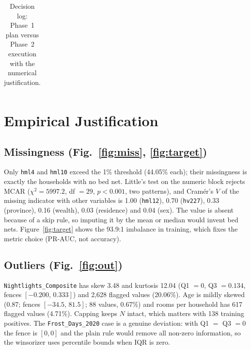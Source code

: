 \documentclass[11pt]{article}
\begin{document}
\begin{table}[t]
\begin{tabularx}{\textwidth}{>{\raggedright\arraybackslash}p{2.1cm}>{\raggedright\arraybackslash}p{3.7cm}>{\raggedright\arraybackslash}p{4.4cm}>{\raggedright\arraybackslash}X}
\bottomrule
\end{tabularx}
\caption{Decision log: Phase~1 plan versus Phase~2 execution with the numerical justification.}
\label{tab:log}
\end{table}

\section{Empirical Justification}
\subsection{Missingness (Fig.~\ref{fig:miss}, \ref{fig:target})}
Only \texttt{hml4} and \texttt{hml10} exceed the 1\% threshold (44.05\% each); their missingness is exactly the households with no bed net. Little's test on the numeric block \cite{little1988} rejects MCAR ($\chi^2=5997.2$, df $=29$, $p<0.001$, two patterns), and Cram\'er's $V$ of the missing indicator with other variables is 1.00 (\texttt{hml12}), 0.70 (\texttt{hv227}), 0.33 (province), 0.16 (wealth), 0.03 (residence) and 0.04 (sex). The value is absent because of a skip rule, so imputing it by the mean or median would invent bed nets. Figure~\ref{fig:target} shows the 93.9:1 imbalance in training, which fixes the metric choice (PR-AUC, not accuracy).

\subsection{Outliers (Fig.~\ref{fig:out})}
\texttt{Nightlights\_Composite} has skew 3.48 and kurtosis 12.04 (Q1 $=0$, Q3 $=0.134$, fences $[-0.200,\,0.333]$) and 2{,}628 flagged values (20.06\%). Age is mildly skewed (0.87; fences $[-34.5,\,81.5]$; 88 values, 0.67\%) and rooms per household has 617 flagged values (4.71\%). Capping keeps $N$ intact, which matters with 138 training positives. The \texttt{Frost\_Days\_2020} case is a genuine deviation: with Q1 $=$ Q3 $=0$ the fence is $[0,0]$ and the plain rule would remove all non-zero information, so the winsorizer uses percentile bounds when IQR is zero.
\end{document}
